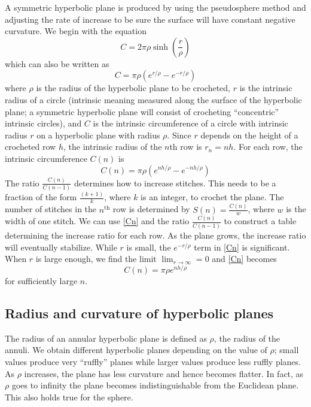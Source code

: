 \documentclass[letterpaper,titlepage]{article}
\begin{document}
A symmetric hyperbolic plane is produced by using the pseudosphere method and adjusting the rate of increase to be sure the surface will have constant negative curvature. We begin with the equation
\begin{equation}
C = 2 \pi \rho \sinh \left( \frac{r}{\rho} \right)
\label{Csinh}
\end{equation}
which can also be written as
\begin{equation}
C = \pi \rho \left( e^{r/\rho} - e^{-r/\rho} \right)
\label{Ce}
\end{equation}
where $\rho$ is the radius of the hyperbolic plane to be crocheted, $r$ is the intrinsic radius of a circle (intrinsic meaning measured along the surface of the hyperbolic plane; a symmetric hyperbolic plane will consist of crocheting ``concentric'' intrinsic circles), and $C$ is the intrinsic circumference of a circle with intrinsic radius $r$ on a hyperbolic plane with radius $\rho$.
Since $r$ depends on the height of a crocheted row $h$, the intrinsic radius of the $n$th row is $r_n = nh$.
For each row, the intrinsic circumference $C(n)$ is
\begin{equation}
C(n) = \pi \rho \left( e^{nh/\rho} - e^{-nh/\rho} \right)
\label{Cn}
\end{equation}
The ratio $\frac{C(n)}{C(n-1)}$ determines how to increase stitches.
This needs to be a fraction of the form $\frac{(k+1)}{k}$, where $k$ is an integer, to crochet the plane.
The number of stitches in the $n^{\text{th}}$ row is determined by $S(n) = \frac{C(n)}{w}$, where $w$ is the width of one stitch.
We can use \eqref{Cn} and the ratio $\frac{C(n)}{C(n-1)}$ to construct a table determining the increase ratio for each row.
As the plane grows, the increase ratio will eventually stabilize.
While $r$ is small, the $e^{-r/\rho}$ term in \eqref{Cn} is significant.
When $r$ is large enough, we find the limit $\lim_{r \to \infty} = 0$ and \eqref{Cn} becomes
\begin{equation}
C(n) = \pi \rho e^{nh/\rho}
\end{equation}
for sufficiently large $n$.

\subsection{Radius and curvature of hyperbolic planes}
\label{hradius}
The radius of an annular hyperbolic plane is defined as $\rho$, the radius of the annuli.
We obtain different hyperbolic planes depending on the value of $\rho$; small values produce very ``ruffly'' planes while larger values produce less ruffly planes.
As $\rho$ increases, the plane has less curvature and hence becomes flatter.
In fact, as $\rho$ goes to infinity the plane becomes indistinguishable from the Euclidean plane.
This also holds true for the sphere.\cite{adventures}
\end{document}
